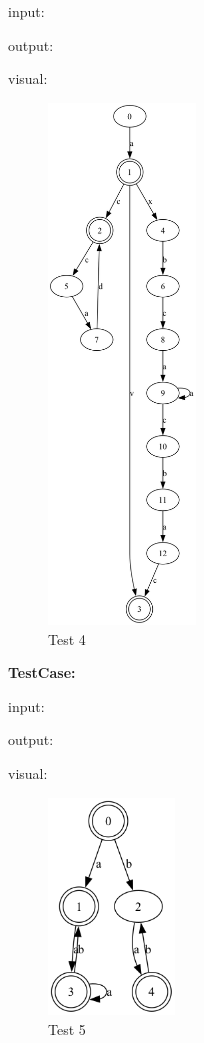 \documentclass{hdureport}
\begin{document}
\noindent\textsf{input:}

\noindent\textsf{output:}

\newpage
\noindent\textsf{visual:}
\begin{figure}[H]
    \centering
    \includegraphics[width=0.35\textwidth]{dfa_test/4.png}
    \caption{Test 4}
\end{figure}

\newpage
\noindent\textbf{TestCase:} 

\noindent\textsf{input:}

\noindent\textsf{output:}

\noindent\textsf{visual:}
\begin{figure}[H]
    \centering
    \includegraphics[width=0.3\textwidth]{dfa_test/5.png}
    \caption{Test 5}
\end{figure}
\end{document}
